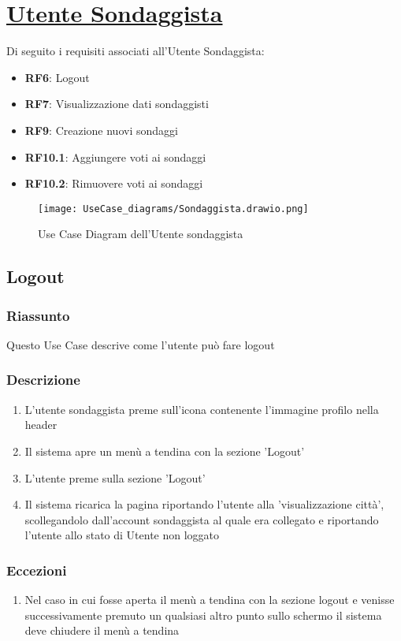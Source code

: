 \section{\underline{Utente Sondaggista}}
    Di seguito i requisiti associati all'Utente Sondaggista:
    \begin{itemize}
        \item \textbf{RF6}: Logout
        \item \textbf{RF7}: Visualizzazione dati sondaggisti
        \item \textbf{RF9}: Creazione nuovi sondaggi
        \item \textbf{RF10.1}: Aggiungere voti ai sondaggi
        \item \textbf{RF10.2}: Rimuovere voti ai sondaggi
    \end{itemize}
    \begin{figure}[H]
        \centering
        \texttt{[image: UseCase\_diagrams/Sondaggista.drawio.png]}
        \caption{Use Case Diagram dell'Utente sondaggista}
    \end{figure}

    \subsection{Logout}
        \subsubsection{Riassunto}
            Questo Use Case descrive come l'utente può fare logout
        \subsubsection{Descrizione}
            \begin{enumerate}
                \item L'utente sondaggista preme sull'icona contenente l'immagine profilo nella header
                \item Il sistema apre un menù a tendina con la sezione 'Logout'
                \item L'utente preme sulla sezione 'Logout'
                \item Il sistema ricarica la pagina riportando l'utente alla 'visualizzazione città', scollegandolo dall'account sondaggista al quale era collegato e riportando l'utente allo stato di Utente non loggato
            \end{enumerate}
        \subsubsection{Eccezioni}
            \begin{enumerate}
                \item Nel caso in cui fosse aperta il menù a tendina con la sezione logout e venisse successivamente premuto un qualsiasi altro punto sullo schermo il sistema deve chiudere il menù a tendina
            \end{enumerate}

